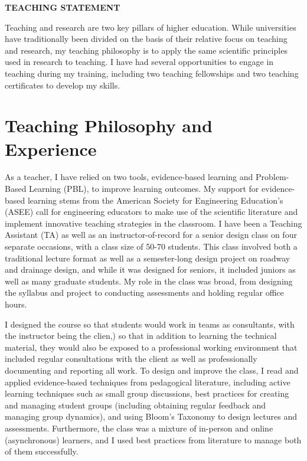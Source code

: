 \documentclass[12pt]{article}
\begin{document}
 \sloppy %
\begin{center}
{\large \uppercase{\textbf{Teaching Statement}}}
\end{center}

Teaching and research are two key pillars of higher education. While universities have traditionally been divided on the basis of their relative focus on teaching and research, my teaching philosophy is to apply the same scientific principles used in research to teaching. I have had several opportunities to engage in teaching during my training, including two teaching fellowships and two teaching certificates to develop my skills. 

\section*{Teaching Philosophy and Experience}
As a teacher, I have relied on two tools, evidence-based learning and Problem-Based Learning (PBL), to improve learning outcomes. My support for evidence-based learning stems from the American Society for Engineering Education's (ASEE) call for engineering educators to make use of the scientific literature and implement innovative teaching strategies in the classroom. I have been a Teaching Assistant (TA) as well as an instructor-of-record for a senior design class on four separate occasions, with a class size of 50-70 students. This class involved both a traditional lecture format as well as a semester-long design project on roadway and drainage design, and while it was designed for seniors, it included juniors as well as many graduate students. My role in the class was broad, from designing the syllabus and project to conducting assessments and holding regular office hours. 

I designed the course so that students would work in teams as consultants, with the instructor being the clien,) so that in addition to learning the technical material, they would also be exposed to a professional working environment that included regular consultations with the client as well as professionally documenting and reporting all work. To design and improve the class, I read and applied evidence-based techniques from pedagogical literature, including active learning techniques such as small group discussions, best practices for creating and managing student groups (including obtaining regular feedback and managing group dynamics), and using Bloom's Taxonomy to design lectures and assessments. Furthermore, the class was a mixture of in-person and online (asynchronous) learners, and I used best practices from literature to manage both of them successfully. 
\end{document}
